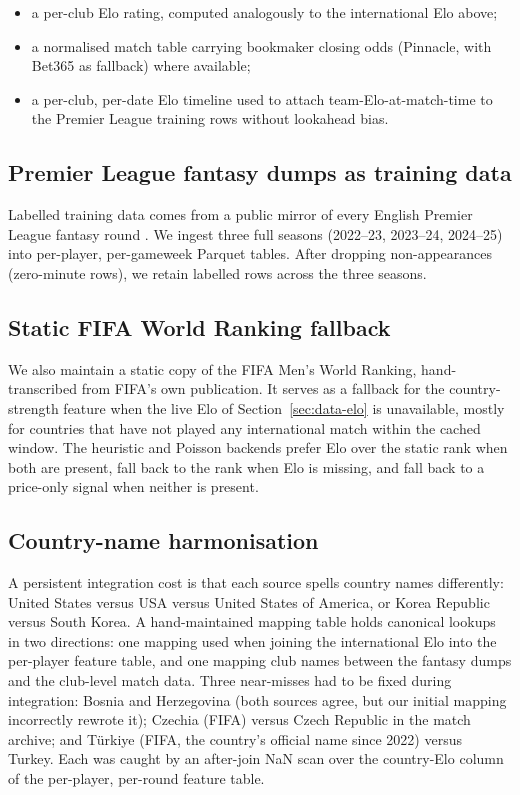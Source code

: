 \begin{itemize}
\item a per-club Elo rating, computed analogously to the
  international Elo above;
\item a normalised match table carrying bookmaker closing odds
  (Pinnacle, with Bet365 as fallback) where available;
\item a per-club, per-date Elo timeline used to attach
  team-Elo-at-match-time to the Premier League training rows without
  lookahead bias.
\end{itemize}

\subsection{Premier League fantasy dumps as training data}
\label{sec:data-fpl}

Labelled training data comes from a public mirror of every English
Premier League fantasy round \citep{vaastav}. We ingest three full
seasons (2022--23, 2023--24, 2024--25) into per-player, per-gameweek
Parquet tables. After dropping non-appearances (zero-minute rows), we
retain \EplTrainingRows{} labelled rows across
the three seasons.

\subsection{Static FIFA World Ranking fallback}
\label{sec:data-rankings}

We also maintain a static copy of the FIFA Men's World Ranking,
hand-transcribed from FIFA's own publication. It serves as a fallback
for the country-strength feature when the live Elo of
Section~\ref{sec:data-elo} is unavailable, mostly for countries that
have not played any international match within the cached window. The
heuristic and Poisson backends prefer Elo over the static rank when
both are present, fall back to the rank when Elo is missing, and fall
back to a price-only signal when neither is present.

\subsection{Country-name harmonisation}
\label{sec:data-names}

A persistent integration cost is that each source spells country
names differently: United States versus USA versus United States of
America, or Korea Republic versus South Korea. A hand-maintained
mapping table holds canonical lookups in two directions: one mapping
used when joining the international Elo into the per-player feature
table, and one mapping club names between the fantasy dumps and the
club-level match data. Three near-misses had to be fixed during
integration: Bosnia and Herzegovina (both sources agree, but our
initial mapping incorrectly rewrote it); Czechia (FIFA) versus Czech
Republic in the match archive; and T\"urkiye (FIFA, the country's
official name since 2022) versus Turkey. Each was caught by an
after-join NaN scan over the country-Elo column of the per-player,
per-round feature table.
